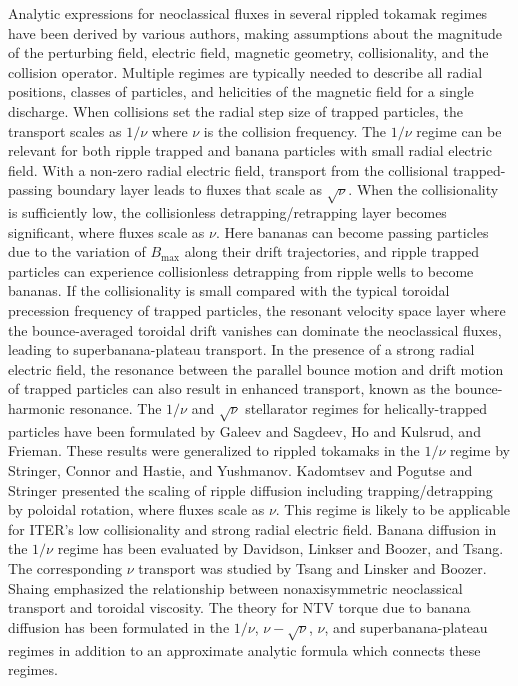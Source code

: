 \documentclass[aip, pop, preprint]{revtex4-1}
\numberwithin{figure}{section}
\numberwithin{equation}{section}
\begin{document}
Analytic expressions for neoclassical fluxes in several rippled tokamak regimes have been derived by various authors, making assumptions about the magnitude of the perturbing field, electric field, magnetic geometry, collisionality, and the collision operator. Multiple regimes are typically needed to describe all radial positions, classes of particles, and helicities of the magnetic field for a single discharge. When collisions set the radial step size of trapped particles, the transport scales as $1/\nu$ where $\nu$ is the collision frequency. The $1/\nu$ regime can be relevant for both ripple trapped and banana particles with small radial electric field. With a non-zero radial electric field, transport from the collisional trapped-passing boundary layer leads to fluxes that scale as $\sqrt{\nu}$. When the collisionality is sufficiently low, the collisionless detrapping/retrapping layer becomes significant, where fluxes scale as $\nu$. Here bananas can become passing particles due to the variation of $B_{\max}$ along their drift trajectories,\cite{Shaing2009} and ripple trapped particles can experience collisionless detrapping from ripple wells to become bananas.\cite{Shaing1982a, Shaing1982b} If the collisionality is small compared with the typical toroidal precession frequency of trapped particles, the resonant velocity space layer where the bounce-averaged toroidal drift vanishes can dominate the neoclassical fluxes, leading to superbanana-plateau transport.\cite{Shaing2009_sbp} In the presence of a strong radial electric field, the resonance between the parallel bounce motion and drift motion of trapped particles can also result in enhanced transport, known as the bounce-harmonic resonance.\cite{Linsker1982,Park2009} The $1/\nu$ and $\sqrt{\nu}$ stellarator regimes for helically-trapped particles have been formulated by Galeev and Sagdeev,\cite{Galeev1969} Ho and Kulsrud,\cite{Ho1987} and Frieman.\cite{Frieman1970} These results were generalized to rippled tokamaks in the $1/\nu$ regime by Stringer,\cite{Stringer1972} Connor and Hastie,\cite{Connor1973} and Yushmanov.\cite{Yushmanov1982} Kadomtsev and Pogutse\cite{Kadomtsev1971} and Stringer \cite{Stringer1972} presented the scaling of ripple diffusion including trapping/detrapping by poloidal rotation, where fluxes scale as $\nu$. This regime is likely to be applicable for ITER's low collisionality and strong radial electric field. Banana diffusion in the $1/\nu$ regime has been evaluated by Davidson,\cite{Davidson1976} Linkser and Boozer,\cite{Linsker1982} and Tsang.\cite{Tsang1977} The corresponding $\nu$ transport was studied by Tsang \cite{Tsang1977} and Linsker and Boozer.\cite{Linsker1982} Shaing emphasized the relationship between nonaxisymmetric neoclassical transport and toroidal viscosity.\cite{Shaing1983} The theory for NTV torque due to banana diffusion has been formulated in the $1/\nu$,\cite{Shaing2003} $\nu-\sqrt{\nu}$,\cite{Shaing2008} $\nu$,\cite{Shaing2009} and superbanana-plateau \cite{Shaing2009_sbp} regimes in addition to an approximate analytic formula which connects these regimes.\cite{Shaing2010}
\end{document}
